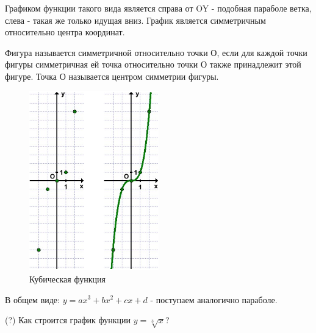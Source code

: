 Графиком функции такого вида является справа от OY - подобная параболе ветка, слева  - такая же только идущая вниз. График является симметричным относительно центра координат.

Фигура называется симметричной относительно точки О, если для каждой точки фигуры симметричная ей точка относительно точки О также принадлежит этой фигуре. Точка О называется центром симметрии фигуры.

\begin{figure}[h!]
	\centering
	\includegraphics[width=0.5\textwidth]{img/kub.png}
	\caption{Кубическая функция}
\end{figure}

В общем виде: $y = ax^3+bx^2+cx + d$ - поступаем аналогично параболе.

(?) Как строится график функции $y = \sqrt[3]{x}$?
